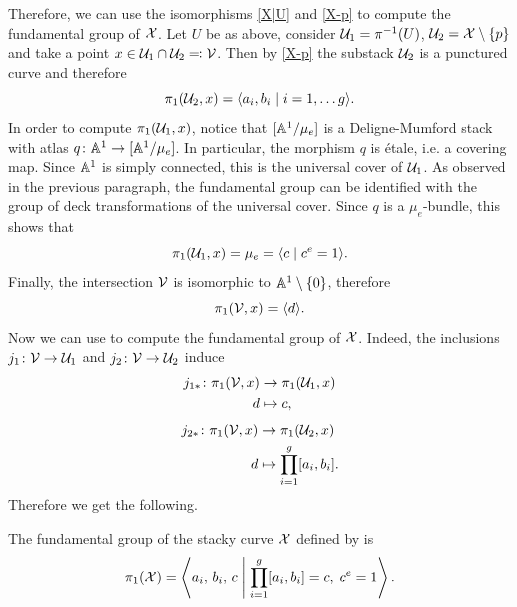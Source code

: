 Therefore, we can use the isomorphisms \eqref{X|U} and \eqref{X-p} to compute the fundamental group of $\mathcal{X}$. Let $U$ be as above, consider $\mathcal{U}_1 = \pi^{-1}(U)$, $\mathcal{U}_2 = \mathcal{X} \setminus \{ p\}$ and take a point $x \in \mathcal{U}_1 \cap \mathcal{U}_2 \eqqcolon \mathcal{V}$.
Then by \eqref{X-p} the substack $\mathcal{U}_2$ is a punctured curve and therefore
\[
\pi_1(\mathcal{U}_2, x) = \langle a_i, b_i \mid i =1, \dots g \rangle.
\]
In order to compute $\pi_1(\mathcal{U}_1, x)$, notice that $[\mathbb{A}^1/\mu_e]$ is a Deligne-Mumford stack with atlas $q \colon \mathbb{A}^1 \to [\mathbb{A}^1/\mu_e]$. In particular, the morphism $q$ is étale, i.e. a covering map. Since $\mathbb{A}^1$ is simply connected, this is the universal cover of $\mathcal{U}_1$. As observed in the previous paragraph, the fundamental group can be identified with the group of deck transformations of the universal cover. Since $q$ is a $\mu_e$-bundle, this shows that
\[
\pi_1(\mathcal{U}_1, x) = \mu_e =  \langle c \mid c^e=1 \rangle.
\]
Finally, the intersection $\mathcal{V}$ is isomorphic to $\mathbb{A}^1 \setminus\{0\}$, therefore
\[
\pi_1(\mathcal{V}, x) = \langle d \rangle.
\]
Now we can use  to compute the fundamental group of $\mathcal{X}$. Indeed, the inclusions $j_1\colon \mathcal{V} \to \mathcal{U}_1$ and $j_2 \colon \mathcal{V} \to \mathcal{U}_2$ induce
\begin{align}
j_{1*}\colon \pi_1(\mathcal{V}, x) & \to \pi_1(\mathcal{U}_1, x)\\
d & \mapsto c,
\end{align}
\begin{align}
j_{2*}\colon \pi_1(\mathcal{V}, x) & \to \pi_1(\mathcal{U}_2, x)\\
d & \mapsto \prod_{i = 1}^g [a_i, b_i].
\end{align}
Therefore we get the following.
\begin{prop}
The fundamental group of the stacky curve $\mathcal{X}$ defined by  is
\begin{equation} \label{eq: fundamental group of stacky curve}
\pi_1(\mathcal{X}) = \left\langle a_i, \, b_i, \, c \;\middle|\; \prod_{i = 1}^g [a_i, b_i] = c, \; c^e = 1 \right\rangle .
\end{equation}
\end{prop}